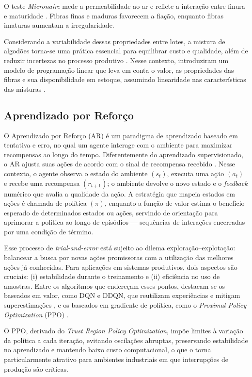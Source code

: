 \documentclass[a4paper,12pt]{article}
\begin{document}
O teste \textit{Micronaire} mede a permeabilidade ao ar e reflete a interação entre finura e maturidade \cite{lord19562}. Fibras finas e maduras favorecem a fiação, enquanto fibras imaturas aumentam a irregularidade. 

Considerando a variabilidade dessas propriedades entre lotes, a mistura de algodões torna-se uma prática essencial para equilibrar custo e qualidade, além de reduzir incertezas no processo produtivo \cite{takahashi_2016}. Nesse contexto,  introduziram um modelo de programação linear que leva em conta o valor, as propriedades das fibras e sua disponibilidade em estoque, assumindo linearidade nas características das misturas \cite{waters_effect_1961}. 

\subsection{Aprendizado por Reforço}

O Aprendizado por Reforço (AR) é um paradigma de aprendizado baseado em tentativa e erro, no qual um agente interage com o ambiente para maximizar recompensas ao longo do tempo. Diferentemente do aprendizado supervisionado, o AR ajusta suas ações de acordo com o sinal de recompensa recebido \cite{sutton_reinforcement_2014}. Nesse contexto, o agente observa o estado do ambiente \((s_t)\), executa uma ação \((a_t)\) e recebe uma recompensa \((r_{t+1})\); o ambiente devolve o novo estado e o \textit{feedback} numérico que avalia a qualidade da ação. A estratégia que mapeia estados em ações é chamada de política \((\pi)\), enquanto a função de valor estima o benefício esperado de determinados estados ou ações, servindo de orientação para aprimorar a política ao longo de episódios — sequências de interações encerradas por uma condição de término.

Esse processo de \textit{trial-and-error} está sujeito ao dilema exploração–explotação: balancear a busca por novas ações promissoras com a utilização das melhores ações já conhecidas. Para aplicações em sistemas produtivos, dois aspectos são cruciais: (i) estabilidade durante o treinamento e (ii) eficiência no uso de amostras. Entre os algoritmos que endereçam esses pontos, destacam-se os baseados em valor, como DQN e DDQN, que reutilizam experiências e mitigam superestimações \cite{hasselt2015deep}, e os baseados em gradiente de política, como o \textit{Proximal Policy Optimization} (PPO) \cite{schulman_proximal_2017}. 

O PPO, derivado do \textit{Trust Region Policy Optimization}, impõe limites à variação da política a cada iteração, evitando oscilações abruptas, preservando estabilidade no aprendizado e mantendo baixo custo computacional, o que o torna particularmente atrativo para ambientes industriais em que interrupções de produção são críticas.
\end{document}
